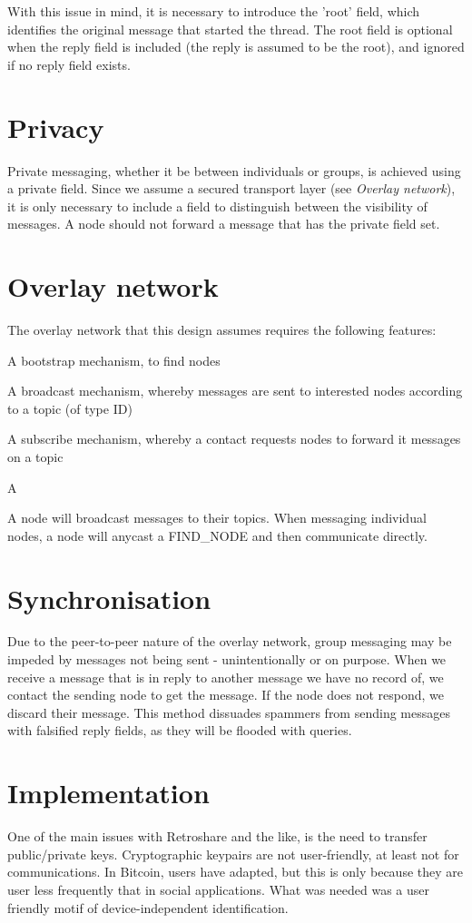 \documentclass[10pt,a4paper,onecolumn]{article}
\begin{document}
With this issue in mind, it is necessary to introduce the 'root' field, which identifies the original message that started the thread. The root field is  optional when the reply field is included (the reply is assumed to be the root), and ignored if no reply field exists.


\section{Privacy}
Private messaging, whether it be between individuals or groups, is achieved using a private field. Since we assume a secured transport layer (see \textit{Overlay network}), it is only necessary to include a field to distinguish between the visibility of messages. A node should not forward a message that has the private field set. 


\section{Overlay network}
The overlay network that this design assumes requires the following features:
\begin{list}
\item A bootstrap mechanism, to find nodes
\item A broadcast mechanism, whereby messages are sent to interested nodes according to a topic (of type ID)
\item A subscribe mechanism, whereby a contact requests nodes to forward it messages on a topic
\item A 
\end{list}

A node will broadcast messages to their topics. When messaging individual nodes, a node will anycast a FIND_NODE and then communicate directly.


\section{Synchronisation}
Due to the peer-to-peer nature of the overlay network, group messaging may be impeded by messages not being sent - unintentionally or on purpose. When we receive a message that is in reply to another message we have no record of, we contact the sending node to get the message. If the node does not respond, we discard their message. This method dissuades spammers from sending messages with falsified reply fields, as they will be flooded with queries. 


\section{Implementation}
One of the main issues with Retroshare and the like, is the need to transfer public/private keys. Cryptographic keypairs are not user-friendly, at least not for communications. In Bitcoin, users have adapted, but this is only because they are user less frequently that in social applications. What was needed was a user friendly motif of device-independent identification. 
\end{document}
